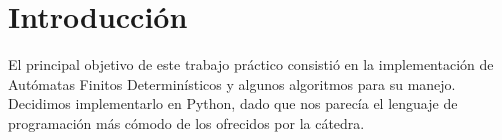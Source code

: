 \section{Introducción}

\indent \indent El principal objetivo de este trabajo práctico consistió en la implementación de Autómatas Finitos Determinísticos y algunos algoritmos para su manejo.\\
\indent Decidimos implementarlo en Python, dado que nos parecía el lenguaje de programación más cómodo de los ofrecidos por la cátedra.\\
